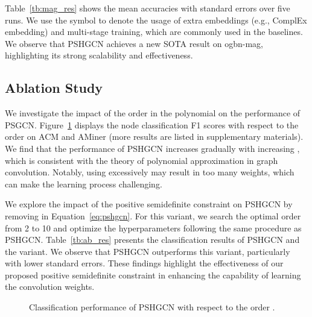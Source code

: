 \documentclass{article}
\begin{document}
Table~\ref{tb:mag_res} shows the mean accuracies with standard errors over five runs. We use the symbol  to denote the usage of extra embeddings (e.g., ComplEx embedding) and multi-stage training, which are commonly used in the baselines. We observe that PSHGCN achieves a new SOTA result on ogbn-mag, highlighting its strong scalability and effectiveness.


\subsection{Ablation Study}\label{se:ab}
We investigate the impact of the order  in the polynomial  on the performance of PSGCN. Figure~\ref{fig:f1-K} displays the node classification F1 scores with respect to the order  on ACM and AMiner (more results are listed in supplementary materials). We find that the performance of PSHGCN increases gradually with increasing , which is consistent with the theory of polynomial approximation in graph convolution. Notably, using excessively  may result in too many weights, which can make the learning process challenging.

We explore the impact of the positive semidefinite constraint on PSHGCN by removing  in Equation~\eqref{eq:pshgcn}. For this variant, we search the optimal order  from 2 to 10 and optimize the hyperparameters following the same procedure as PSHGCN. Table~\ref{tb:ab_res} presents the classification results of PSHGCN and the variant. We observe that PSHGCN outperforms this variant, particularly with lower standard errors. These findings highlight the effectiveness of our proposed positive semidefinite constraint in enhancing the capability of learning the convolution weights.


\begin{figure}[t]
    \centering
    \vspace{-6mm}
   \vspace{-2mm}
   \caption{Classification performance of PSHGCN with respect to the order .}
   \vspace{-5mm}
   \label{fig:f1-K}
\end{figure}
\end{document}
